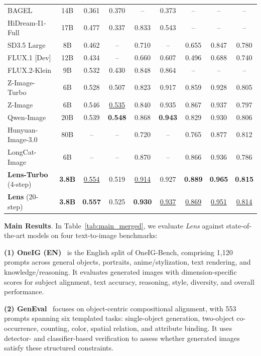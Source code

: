 \begin{table}[!t]
\begin{tabular}{l|c|cc|c|c|ccc}
    BAGEL & 14B
      & 0.361 & 0.370 & -- & 0.373 & -- & -- & -- \\
    HiDream-I1-Full & 17B
      & 0.477 & 0.337 & 0.833 & 0.543 & -- & -- & -- \\
    SD3.5 Large & 8B
      & 0.462 & -- & 0.710 & -- & 0.655 & 0.847 & 0.780 \\
    FLUX.1 [Dev] & 12B
      & 0.434 & -- & 0.660 & 0.607 & 0.496 & 0.688 & 0.740 \\
    FLUX.2-Klein & 9B
      & 0.532 & 0.430 & 0.848 & 0.864 & -- & -- & -- \\
    Z-Image-Turbo & 6B
      & 0.528 & 0.507 & 0.823 & 0.917 & 0.859 & 0.928 & 0.805 \\
    Z-Image & 6B
      & 0.546 & \underline{0.535} & 0.840 & 0.935 & 0.867 & 0.937 & 0.797 \\
    Qwen-Image & 20B
      & 0.539 & \textbf{0.548} & 0.868 & \textbf{0.943} & 0.829 & 0.930 & 0.806 \\
    Hunyuan-Image-3.0 & 80B
      & -- & -- & 0.720 & -- & 0.765 & 0.877 & 0.812 \\
    LongCat-Image & 6B
      & -- & -- & 0.870 & -- & 0.866 & 0.936 & 0.786 \\
    \midrule
    \textbf{Lens-Turbo} (4-step) & \textbf{3.8B}
      & \underline{0.554} & 0.519 & \underline{0.914} & 0.927 & \textbf{0.889} & \textbf{0.965} & \textbf{0.815} \\
    \textbf{Lens} (20-step) & \textbf{3.8B}
      & \textbf{0.557} & 0.525 & \textbf{0.930} & \underline{0.937} & \underline{0.869} & \underline{0.951} & \underline{0.814} \\
    \bottomrule
  \end{tabular}
\end{table}


\noindent\textbf{Main Results}. In Table~\ref{tab:main_merged}, we evaluate \textit{Lens} against state-of-the-art models on four text-to-image benchmarks: 


\noindent\textbf{(1) OneIG (EN)}~\citep{chang2025oneigbench} is the English split of OneIG-Bench, comprising 1,120 prompts across general objects, portraits, anime/stylization, text rendering, and knowledge/reasoning. It evaluates generated images with dimension-specific scores for subject alignment, text accuracy, reasoning, style, diversity, and overall performance. 

\noindent\textbf{(2) GenEval}~\citep{ghosh2023geneval} focuses on object-centric compositional alignment, with 553 prompts spanning six templated tasks: single-object generation, two-object co-occurrence, counting, color, spatial relation, and attribute binding. It uses detector- and classifier-based verification to assess whether generated images satisfy these structured constraints.


